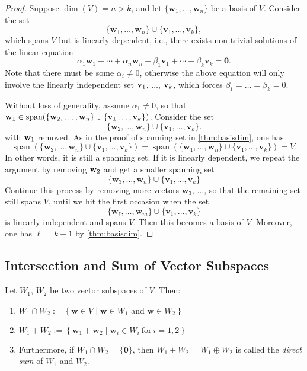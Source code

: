 \begin{proof}
Suppose $\dim(V) = n > k$, and let $\{ \mathbf{w}_1, \ldots, \mathbf{w}_n \}$ be a basis of $V$. Consider the set
\[
\{ \mathbf{w}_1, \ldots, \mathbf{w}_n \} \cup \{ \mathbf{v}_1, \ldots, \mathbf{v}_k \},
\]
which spans $V$ but is linearly dependent, i.e., there exists non-trivial solutions of the linear equation
\[
\alpha_1 \mathbf{w}_1 + \cdots + \alpha_n \mathbf{w}_n + \beta_1 \mathbf{v}_1 + \cdots + \beta_k \mathbf{v}_k = \mathbf{0}.
\]
Note that there must be some $\alpha_i \neq 0$, otherwise the above equation will only involve the linearly independent set ${\bf v}_1$, $\dots$, ${\bf v}_k$, which forces $\beta_1 = \dots = \beta_k = 0$. 


Without loss of generality, assume $\alpha_1 \neq 0$, so that ${\bf w}_1 \in  \operatorname{span}(\{{\bf w}_2, \dots, {\bf w}_n\} \cup \{ {\bf v}_1 \dots, {\bf v}_k\})$. Consider the set
\[
\{ \mathbf{w}_2, \ldots, \mathbf{w}_n \} \cup \{ \mathbf{v}_1, \ldots, \mathbf{v}_k \}.
\]
with ${\bf w}_1$ removed. As in the proof of spanning set in \autoref{thm:basisdim}, one has
$$\operatorname{span}(\{ \mathbf{w}_2, \ldots, \mathbf{w}_n \} \cup \{ \mathbf{v}_1, \ldots, \mathbf{v}_k \}) = \operatorname{span}(\{ \mathbf{w}_1, \ldots, \mathbf{w}_n \} \cup \{ \mathbf{v}_1, \ldots, \mathbf{v}_k \}) = V.$$
In other words, it is still a spanning set. If it is linearly dependent, we repeat the argument by removing ${\bf w}_2$ and get a smaller spanning set
$$\{ \mathbf{w}_3, \ldots, \mathbf{w}_n \} \cup \{ \mathbf{v}_1, \ldots, \mathbf{v}_k \}$$
Continue this process by removing more vectors $\mathbf{w}_3$, $\dots$, so that the remaining set still spans $V$, until we hit the first occasion when the set
\[
 \{ \mathbf{w}_{\ell}, \ldots, \mathbf{w}_m \} \cup \{ \mathbf{v}_1, \ldots, \mathbf{v}_k \}
\]
is linearly independent and spans $V$. Then this becomes a basis of $V$. Moreover, one has $\ell = k+1$ by \autoref{thm:basisdim}.
\end{proof}

\subsection{Intersection and Sum of Vector Subspaces}

\begin{definition} \label{def:sumintersect} Let \(W_1\), \(W_2\) be two vector subspaces of \(V\). Then:

\begin{enumerate}
  \item \(W_1 \cap W_2 := \left\{ \mathbf{w} \in V \mid \mathbf{w} \in W_1 \text{ and } \mathbf{w} \in W_2 \right\}\)

  \item \(W_1 + W_2 := \left\{ \mathbf{w}_1 + \mathbf{w}_2 \mid \mathbf{w}_i \in W_i\ \text{for}\ i = 1,2 \right\}\)

  \item Furthermore, if \(W_1 \cap W_2 = \{ \mathbf{0} \}\), then \(W_1 + W_2 = W_1 \oplus W_2\) is called the \emph{direct sum} of $W_1$ and $W_2$.
\end{enumerate}
\end{definition}

